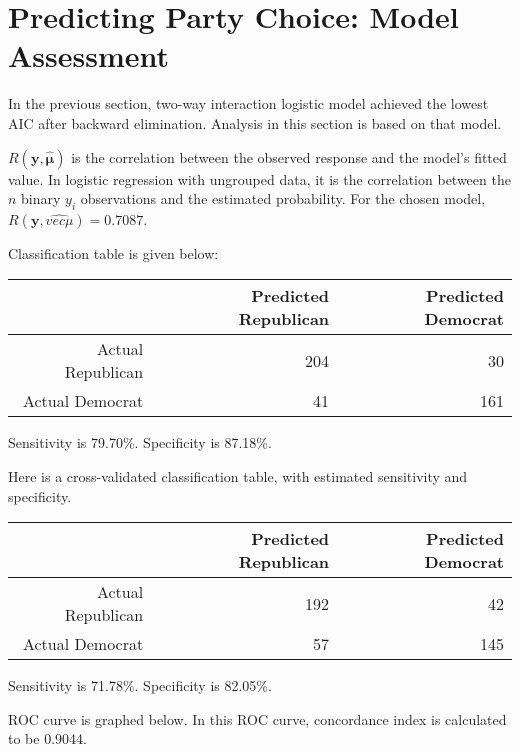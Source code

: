\documentclass[12pt,a4paper]{article}
\begin{document}
\section{Predicting Party Choice: Model Assessment}


In the previous section, two-way interaction logistic model achieved the lowest AIC after backward elimination. Analysis in this section is based on that model.

\renewcommand{\vec}[1]{\mathbf{#1}}

	 $R(\vec{y}, \hat{\vec{\mu}})$ is the correlation between the observed response and the model's fitted value. In logistic regression with ungrouped data, it is the correlation between the $n$ binary ${y_i}$ observations and the estimated probability. For the chosen model, $R(\vec{y}, \hat{vec{\mu}}) = 0.7087$.
 
 
 Classification table is given below:
	
	
	
	\begin{center}
		
		\begin{tabular}{r|rr}
			 & Predicted Republican & Predicted Democrat \\ \hline
			Actual Republican & 204 & 30 \\
			Actual Democrat & 41 &161
			
		\end{tabular}
	
	Sensitivity is 79.70\%. Specificity is 87.18\%.
	\end{center}
	
	
Here is a cross-validated classification table, with estimated sensitivity and specificity.

	
	
	\begin{center}
		
		\begin{tabular}{r|rr}
			& Predicted Republican & Predicted Democrat \\ \hline
			Actual Republican & 192 & 42 \\
			Actual Democrat & 57 &145
			
		\end{tabular}
		
		Sensitivity is 71.78\%. Specificity is 82.05\%.
	\end{center}
	

ROC curve is graphed below. In this ROC curve, concordance index is calculated to be 0.9044.
\end{document}
